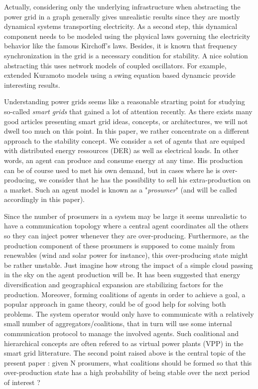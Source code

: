 \documentclass[conference]{IEEEtran}
\begin{document}
Actually, considering only the underlying infrastructure when abstracting the power grid in a graph generally gives unrealistic results since they are mostly dynamical systems transporting electricity. As a second step, this dynamical component needs to be modeled using the physical laws governing the electricity behavior like the famous Kirchoff's laws. Besides, it is known that frequency synchronization in the grid is a necessary condition for stability. A nice solution abstracting this uses network models of coupled oscillators. For example, extended Kuramoto models using a swing equation based dynamcic provide interesting results. 

Understanding power grids seems like a reasonable strarting point for studying so-called \textit{smart grids} that gained a lot of attention recently. As there exists many good articles presenting smart grid ideas, concepts, or architectures, we will not dwell too much on this point. In this paper, we rather concentrate on a different approach to the stability concept. We consider a set of agents that are equiped with distributed energy ressources (DER) as well as electrical loads. In other words, an agent can produce and consume energy at any time. His production can be of course used to met his own demand, but in cases where he is over-producing, we consider that he has the possibility to sell his extra-production on a market. Such an agent model is known as a "\textit{prosumer}" (and will be called accordingly in this paper). 

Since the number of prosumers in a system may be large it seems unrealistic to have a communication topology where a central agent coordinates all the others so they can inject power whenever they are over-producing. Furthermore, as the production component of these prosumers is supposed to come mainly from renewables (wind and solar power for instance), this over-producing state might be rather unstable. Just imagine how strong the impact of a simple cloud passing in the sky on the agent production will be. It has been suggested that energy diversification and geographical expansion are stabilizing factors for the production. Moreover, forming coalitions of agents in order to achieve a goal, a popular approach in game theory, could be of good help for solving both problems. The system operator would only have to communicate with a relatively small number of aggregators/coalitions, that in turn will use some internal communication protocol to manage the involved agents. Such coalitional and hierarchical concepts are often refered to as virtual power plants (VPP) in the smart grid litterature. The second point raised above is the central topic of the present paper : given N prosumers, what coalitions should be formed so that this over-production state has a high probability of being stable over the next period of interest ?
\end{document}
